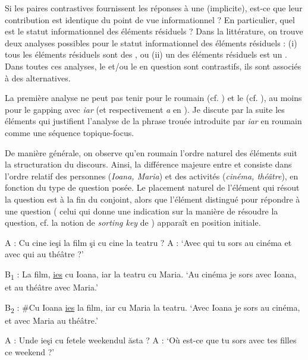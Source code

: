 Si les paires contrastives fournissent les réponses à une  (implicite), est-ce que leur contribution est identique du point de vue informationnel ? En particulier, quel est le statut informationnel des éléments résiduels ? Dans la littérature, on trouve deux analyses possibles pour le statut informationnel des éléments résiduels : (i) tous les éléments résiduels sont des  \citep{Kuno1976,Hartmann2000,Johnson2014}, ou (ii) un des éléments résiduels est un  \citep{Winkler2005,Repp2009,KonietzkoEtAl2010}. Dans toutes ces analyses, le  et/ou le  en question sont contrastifs, {\cad} ils sont associés à des alternatives.

La première analyse ne peut pas tenir pour le roumain (cf. \citealt{BilbiieEtAl2011}) et le  (cf. \citealt{JasinskajaEtAl2009}), au moins pour le gapping avec \textit{iar} (et respectivement \textit{a} en ). Je discute par la suite les éléments qui justifient l’analyse de la phrase trouée introduite par \textit{iar} en roumain comme une séquence topique-focus.

De manière générale, on observe qu’en roumain l’ordre naturel des éléments suit la structuration du discours. Ainsi, la différence majeure entre  et  consiste dans l’ordre relatif des personnes (\textit{Ioana, Maria}) et des activités (\textit{cinéma, théâtre}), en fonction du type de question posée. Le placement naturel de l’élément qui résout la question est à la fin du conjoint, alors que l’élément distingué pour répondre à une question ({\cad} celui qui donne une indication sur la manière de résoudre la question, cf. la notion de \textit{sorting key} de \citealt{Kuno1982}) apparaît en position initiale.  

\ea \label{ch2:ex179}
A : Cu cine ieşi la film şi cu cine la teatru ?
\glt A : ‘Avec qui tu sors au cinéma et avec qui au théâtre ?’

\ea B\textsubscript{1} : La film, \uline{ies} cu Ioana, iar la teatru cu Maria. 
\glt ‘Au cinéma je sors avec Ioana, et au théâtre avec Maria.’

\ex B\textsubscript{2} : \#Cu Ioana \uline{ies} la film, iar cu Maria la teatru. 
\glt ‘Avec Ioana je sors au cinéma, et avec Maria au théâtre.’      
\z
\z

\ea \label{ch2:ex180}
A : Unde ieşi cu fetele weekendul ăsta ?
\glt A : ‘Où est-ce que tu sors avec tes filles ce weekend ?’


